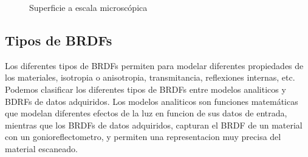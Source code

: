         \begin{figure}[H]
            \vspace{0.5cm}
            \centering
            \caption{Superficie a escala microsc\'opica}
            \vspace{1.0cm}
        \end{figure}

    \egroup


    \subsection{Tipos de BRDFs}
    Los diferentes tipos de BRDFs permiten para modelar diferentes propiedades de los materiales, isotropia o anisotropia,
    transmitancia, reflexiones internas, etc. Podemos clasificar los diferentes tipos de BRDFs entre modelos analiticos y BDRFs
    de datos adquiridos. Los modelos analiticos son funciones matemáticas que modelan diferentes efectos de la luz en funcion de
    sus datos de entrada, mientras que los BRDFs de datos adquiridos, capturan el BRDF de un material con un gonioreflectometro,
    y permiten una representacion muy precisa del material escaneado.

